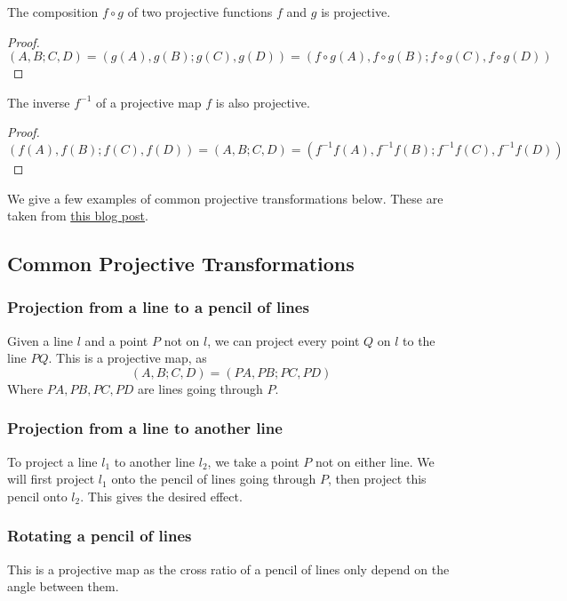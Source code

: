 \documentclass{article}
\theoremstyle{mytheoremstyle}
\theoremstyle{mytheoremstyle}
\theoremstyle{myproblemstyle}
\begin{document}
    \begin{theorem}
        The composition $f \circ g$ of two projective functions $f$ and $g$ is projective.
    \end{theorem}

    \begin{proof}
        \[(A, B; C, D) = (g(A), g(B); g(C), g(D)) = (f \circ g(A), f \circ g(B); f \circ g(C), f \circ g(D))\]
    \end{proof}

    \begin{theorem}
        The inverse $f^{-1}$ of a projective map $f$ is also projective.
    \end{theorem}

    \begin{proof}
        \[(f(A), f(B); f(C), f(D)) = (A, B; C, D) = (f^{-1}f(A), f^{-1}f(B); f^{-1}f(C), f^{-1}f(D))\]
    \end{proof}

    

    We give a few examples of common projective transformations below. These are taken from \href{https://artofproblemsolving.com/community/c473124h1763266_moving_points_tutorial}{this blog post}.


    \subsection{Common Projective Transformations}
    \subsubsection{Projection from a line to a pencil of lines}
    Given a line $l$ and a point $P$ not on $l$, we can project every point $Q$ on $l$ to the line $PQ$. This is a projective map, as \[(A, B; C, D) = (PA, PB; PC, PD)\] Where $PA, PB, PC, PD$ are lines going through $P$.  

    \subsubsection{Projection from a line to another line}
    To project a line $l_1$ to another line $l_2$, we take a point $P$ not on either line. We will first project $l_1$ onto the pencil of lines going through $P$, then project this pencil onto $l_2$. This gives the desired effect.

    \subsubsection{Rotating a pencil of lines}
    This is a projective map as the cross ratio of a pencil of lines only depend on the angle between them.
\end{document}
